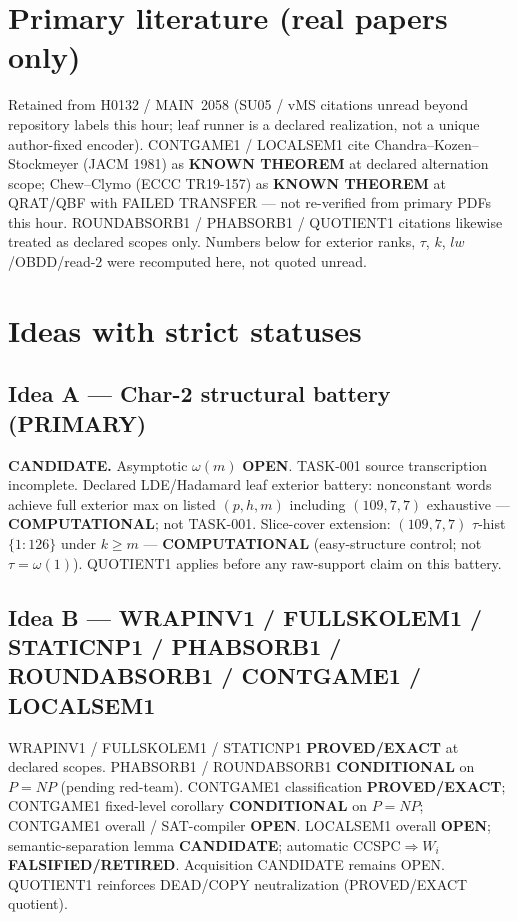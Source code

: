 \documentclass[11pt]{article}
\begin{document}
\section*{Primary literature (real papers only)}
Retained from H0132 / MAIN~2058 (SU05 / vMS citations unread beyond repository labels this hour;
leaf runner is a declared realization, not a unique author-fixed encoder).
CONTGAME1 / LOCALSEM1 cite Chandra--Kozen--Stockmeyer (JACM 1981) as \textbf{KNOWN THEOREM}
at declared alternation scope; Chew--Clymo (ECCC TR19-157) as \textbf{KNOWN THEOREM} at
QRAT/QBF with FAILED TRANSFER --- not re-verified from primary PDFs this hour.
ROUNDABSORB1 / PHABSORB1 / QUOTIENT1 citations likewise treated as declared scopes only.
Numbers below for exterior ranks, $\tau$, $k$, $lw$/OBDD/read-$2$
were recomputed here, not quoted unread.

\section*{Ideas with strict statuses}
\subsection*{Idea A --- Char-2 structural battery (PRIMARY)}
\textbf{CANDIDATE.} Asymptotic $\omega(m)$ \textbf{OPEN}. TASK-001 source transcription incomplete.
Declared LDE/Hadamard leaf exterior battery: nonconstant words achieve full exterior max on
listed $(p,h,m)$ including $(109,7,7)$ exhaustive --- \textbf{COMPUTATIONAL}; not TASK-001.
Slice-cover extension: $(109,7,7)$ $\tau$-hist $\{1{:}126\}$ under $k{\ge}m$ ---
\textbf{COMPUTATIONAL} (easy-structure control; not $\tau=\omega(1)$).
QUOTIENT1 applies before any raw-support claim on this battery.

\subsection*{Idea B --- WRAPINV1 / FULLSKOLEM1 / STATICNP1 / PHABSORB1 / ROUNDABSORB1 / CONTGAME1 / LOCALSEM1}
WRAPINV1 / FULLSKOLEM1 / STATICNP1 \textbf{PROVED/EXACT} at declared scopes.
PHABSORB1 / ROUNDABSORB1 \textbf{CONDITIONAL} on $P=NP$ (pending red-team).
CONTGAME1 classification \textbf{PROVED/EXACT}; CONTGAME1 fixed-level corollary
\textbf{CONDITIONAL} on $P=NP$; CONTGAME1 overall / SAT-compiler \textbf{OPEN}.
LOCALSEM1 overall \textbf{OPEN}; semantic-separation lemma \textbf{CANDIDATE};
automatic CCSPC$\Rightarrow W_i$ \textbf{FALSIFIED/RETIRED}.
Acquisition CANDIDATE remains OPEN.
QUOTIENT1 reinforces DEAD/COPY neutralization (PROVED/EXACT quotient).
\end{document}
